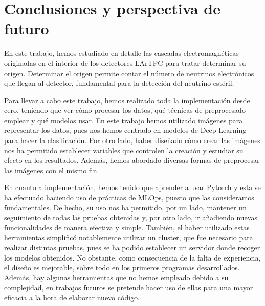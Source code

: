 \documentclass[a4paper,12pt,oneside,titlepage]{book}
\begin{document}


\chapter{Conclusiones y perspectiva de futuro}


En este trabajo, hemos estudiado en detalle las cascadas electromagnéticas originadas en el interior de los detectores LArTPC para tratar determinar su origen. Determinar el origen permite contar el número de neutrinos electrónicos que llegan al detector, fundamental para la detección del neutrino estéril.

Para llevar a cabo este trabajo, hemos realizado toda la implementación desde cero, teniendo que ver cómo procesar los datos, qué técnicas de preprocesado emplear y qué modelos usar. En este trabajo hemos utilizado imágenes para representar los datos, pues nos hemos centrado en modelos de Deep Learning para hacer la clasificación. Por otro lado, haber diseñado cómo crear las imágenes nos ha permitido establecer variables que controlen la creación y estudiar su efecto en los resultados. Además, hemos abordado diversas formas de preprocesar las imágenes con el mismo fin.

En cuanto a implementación, hemos tenido que aprender a usar Pytorch y esta se ha efectuado haciendo uso de prácticas de MLOps, puesto que las consideramos fundamentales. De hecho, su uso nos ha permitido, por un lado, mantener un seguimiento de todas las pruebas obtenidas y, por otro lado, ir añadiendo nuevas funcionalidades de manera efectiva y simple. También, el haber utilizado estas herramientas simplificó notablemente utilizar un cluster, que fue necesario para realizar distintas pruebas, pues se ha podido establecer un servidor donde recoger los modelos obtenidos. No obstante, como consecuencia de la falta de experiencia, el diseño es mejorable, sobre todo en los primeros programas desarrollados. Además, hay algunas herramientas que no hemos empleado debido a su complejidad, en trabajos futuros se pretende hacer uso de ellas para una mayor eficacia a la hora de elaborar nuevo código.
\end{document}
